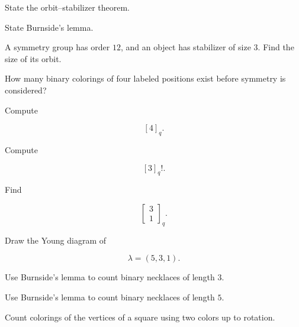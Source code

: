 \begin{exercise}[1]
State the orbit--stabilizer theorem.
\end{exercise}

\begin{exercise}[1]
State Burnside's lemma.
\end{exercise}

\begin{exercise}[1]
A symmetry group has order \(12\), and an object has stabilizer of size
\(3\). Find the size of its orbit.
\end{exercise}

\begin{exercise}[1]
How many binary colorings of four labeled positions exist before
symmetry is considered?
\end{exercise}

\begin{exercise}[1]
Compute

\[
[4]_q.
\]
\end{exercise}

\begin{exercise}[1]
Compute

\[
[3]_q!.
\]
\end{exercise}

\begin{exercise}[1]
Find

\[
\begin{bmatrix}
3\\
1
\end{bmatrix}_q.
\]
\end{exercise}

\begin{exercise}[1]
Draw the Young diagram of

\[
\lambda=(5,3,1).
\]
\end{exercise}

\begin{exercise}[2]
Use Burnside's lemma to count binary necklaces of length \(3\).
\end{exercise}

\begin{exercise}[2]
Use Burnside's lemma to count binary necklaces of length \(5\).
\end{exercise}

\begin{exercise}[2]
Count colorings of the vertices of a square using two colors up to
rotation.
\end{exercise}

